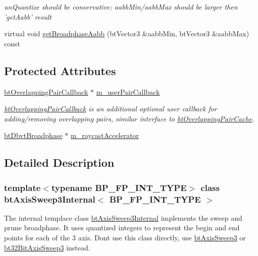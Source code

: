 \begin{CompactItemize}
\begin{CompactList}\small\item\em unQuantize should be conservative: aabbMin/aabbMax should be larger then 'getAabb' result \item\end{CompactList}\item 
virtual void \hyperlink{classbt_axis_sweep3_internal_5f343e29ce818d0b96cb11260bca2a68}{getBroadphaseAabb} (btVector3 \&aabbMin, btVector3 \&aabbMax) const 
\end{CompactItemize}
\subsection*{Protected Attributes}
\begin{CompactItemize}
\item 
\hypertarget{classbt_axis_sweep3_internal_d26657cfc4245f099042178daf885563}{
\hyperlink{classbt_overlapping_pair_callback}{btOverlappingPairCallback} $\ast$ \hyperlink{classbt_axis_sweep3_internal_d26657cfc4245f099042178daf885563}{m\_\-userPairCallback}}
\label{classbt_axis_sweep3_internal_d26657cfc4245f099042178daf885563}

\begin{CompactList}\small\item\em \hyperlink{classbt_overlapping_pair_callback}{btOverlappingPairCallback} is an additional optional user callback for adding/removing overlapping pairs, similar interface to \hyperlink{classbt_overlapping_pair_cache}{btOverlappingPairCache}. \item\end{CompactList}\item 
\hyperlink{structbt_dbvt_broadphase}{btDbvtBroadphase} $\ast$ \hyperlink{classbt_axis_sweep3_internal_a0c964a27cd6722bdd231890b1239528}{m\_\-raycastAccelerator}
\end{CompactItemize}


\subsection{Detailed Description}
\subsubsection*{template$<$typename BP\_\-FP\_\-INT\_\-TYPE$>$ class btAxisSweep3Internal$<$ BP\_\-FP\_\-INT\_\-TYPE $>$}

The internal templace class \hyperlink{classbt_axis_sweep3_internal}{btAxisSweep3Internal} implements the sweep and prune broadphase. It uses quantized integers to represent the begin and end points for each of the 3 axis. Dont use this class directly, use \hyperlink{classbt_axis_sweep3}{btAxisSweep3} or \hyperlink{classbt32_bit_axis_sweep3}{bt32BitAxisSweep3} instead. 

